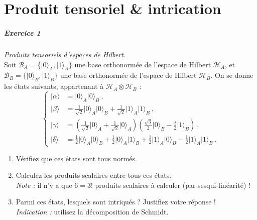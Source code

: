 \chapter{Produit tensoriel \& intrication}

\paragraph{Exercice 1} \textit{Produits tensoriels d'espaces de Hilbert.} \\
Soit $\mathcal B_A = \{ \vert 0 \rangle_A ,  \vert 1 \rangle_A\}$ une base orthonormée de l'espace de Hilbert $\mathcal H_A$, et $\mathcal B_B = \{ \vert 0 \rangle_B ,  \vert 1 \rangle_B\}$ une base orthonormée de l'espace de Hilbert $\mathcal H_B$. On se donne les états suivants, appartenant à $\mathcal H_A \otimes \mathcal H_B$ :
\begin{equation}
\left\lbrace
\begin{split}
\vert \alpha \rangle &= \vert 0 \rangle_A \vert 0 \rangle_B\ , \\
\vert \beta \rangle &= \frac{1}{\sqrt{2}}\vert 0 \rangle_A \vert 0 \rangle_B +   \frac{1}{\sqrt{2}}\vert 1 \rangle_A \vert 1 \rangle_B\ , \\
\vert \gamma \rangle &= \left( \frac{1}{\sqrt{2}}\vert 0 \rangle_A
+\frac{1}{\sqrt{2}}\vert 0 \rangle_A \right) \left(  \frac{\sqrt{3}}{2}
\vert 0 \rangle_B  -  \frac{i}{2}\vert 1 \rangle_B  \right)\ , 
 \\
 \vert \delta\rangle &= 
 \frac{1}{2}\vert 0 \rangle_A \vert 0 \rangle_B
 +\frac{1}{2}\vert 0 \rangle_A \vert 1 \rangle_B
  +\frac{1}{2}\vert 1 \rangle_A \vert 0 \rangle_B
   -\frac{1}{2}\vert 1 \rangle_A \vert 1 \rangle_B\ .
\end{split}
\right.
\end{equation}

\begin{enumerate}
\item Vérifiez que ces états sont tous normés.
\item Calculez les produits scalaires entre tous ces états. \\
\textit{Note :} il n'y a que $6=3!$ produits scalaires à calculer (par sesqui-linéarité) !
\item Parmi ces états, lesquels sont intriqués ? Justifiez votre réponse ! \\
\textit{Indication :} utilisez la décomposition de Schmidt.
\end{enumerate}

